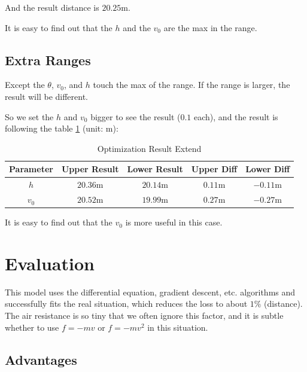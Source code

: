 \documentclass{article}
\begin{document}
And the result distance is $20.25\si{\meter}$.

It is easy to find out that the $h$ and the $v_0$ are the max in the range.

\subsection{Extra Ranges}

Except the $\theta$, $v_0$, and $h$ touch the max of the range. If the range is larger, the result will be different.

So we set the $h$ and $v_0$ bigger to see the result ($0.1$ each), and the result is following the table \ref{table:optimization-result-extend} (unit: \si{\meter}):


\begin{table}[H]
    \centering
    \begin{tabular}{ccccc}
        \hline
        \textbf{Parameter} & \textbf{Upper Result} & \textbf{Lower Result} & \textbf{Upper Diff} & \textbf{Lower Diff} \\
        \hline
        $h$ & $20.36\si{\meter}$ & $20.14\si{\meter}$ & $0.11\si{\meter}$ & $-0.11\si{\meter}$ \\
        $v_0$ & $20.52\si{\meter}$ & $19.99\si{\meter}$ & $0.27\si{\meter}$ & $-0.27\si{\meter}$ \\
        \hline
    \end{tabular}
    \caption{Optimization Result Extend}
    \label{table:optimization-result-extend}
\end{table}


It is easy to find out that the $v_0$ is more useful in this case.

\section{Evaluation}

\label{section:evaluation}

This model uses the differential equation, gradient descent, etc. algorithms and successfully fits the real situation, which reduces the loss to about $1\%$ (distance). The air resistance is so tiny that we often ignore this factor, and it is subtle whether to use $f=-mv$ or $f=-mv^2$ in this situation.

\subsection{Advantages}
\end{document}
